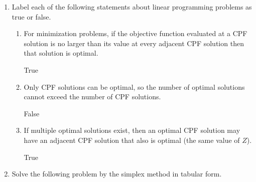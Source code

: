 \documentclass[a4paper]{article}
\begin{document}
\courseheader
{}

\begin{enumerate}
  \setlength{\itemsep}{3\parskip}

  \item Label each of the following statements about linear programming problems as true or false.
  \begin{enumerate}
  	\item  For minimization problems, if the objective function evaluated at a CPF solution is no larger than its value at every adjacent CPF solution then that solution is optimal.
  	\begin{solution}
  			True
  	\end{solution}
  	
  	\item Only CPF solutions can be optimal, so the number of optimal solutions cannot exceed the number of CPF solutions.
  	\begin{solution}
  	False
  	\end{solution}  	
  	
  	\item If multiple optimal solutions exist, then an optimal CPF solution may have an adjacent CPF solution that also is optimal (the same value of $Z$).
  	\begin{solution}
  		True
  	\end{solution}
  	
  \end{enumerate}
  

  \item Solve the following problem by the simplex method in tabular form.
  

\end{enumerate}
\end{document}
